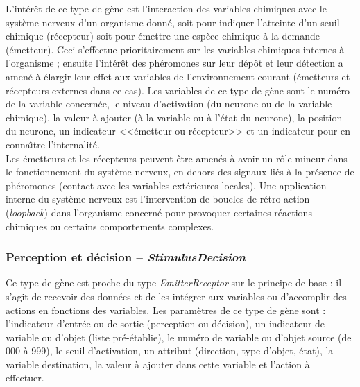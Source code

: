 \documentclass[11pt,twoside,a4paper]{article}
\begin{document}
L'int{\'e}r{\^e}t de ce type de g{\`e}ne est l'interaction des variables chimiques avec le syst{\`e}me nerveux d'un organisme donn{\'e}, soit pour indiquer l'atteinte d'un seuil chimique (r{\'e}cepteur) soit pour {\'e}mettre une esp{\`e}ce chimique {\`a} la demande ({\'e}metteur). Ceci s'effectue prioritairement sur les variables chimiques internes {\`a} l'organisme ; ensuite l'int{\'e}r{\^e}t des ph{\'e}romones sur leur d{\'e}p{\^o}t et leur d{\'e}tection a amen{\'e} {\`a} {\'e}largir leur effet aux variables de l'environnement courant ({\'e}metteurs et r{\'e}cepteurs externes dans ce cas). Les variables de ce type de g{\`e}ne sont le num{\'e}ro de la variable concern{\'e}e, le niveau d'activation (du neurone ou de la variable chimique), la valeur {\`a} ajouter ({\`a} la variable ou {\`a} l'{\'e}tat du neurone), la position du neurone, un indicateur <<{\'e}metteur ou r{\'e}cepteur>> et un indicateur pour en conna{\^\i}tre l'internalit{\'e}.~\\

Les {\'e}metteurs et les r{\'e}cepteurs peuvent {\^e}tre amen{\'e}s {\`a} avoir un r{\^o}le mineur dans le fonctionnement du syst{\`e}me nerveux, en-dehors des signaux li{\'e}s {\`a} la pr{\'e}sence de ph{\'e}romones (contact avec les variables ext{\'e}rieures locales). Une application interne du syst{\`e}me nerveux est l'intervention de boucles de r{\'e}tro-action (\emph{loopback}) dans l'organisme concern{\'e} pour provoquer certaines r{\'e}actions chimiques ou certains comportements complexes. 

\subsubsection{Perception et d{\'e}cision -- \emph{StimulusDecision}}

Ce type de g{\`e}ne est proche du type \emph{EmitterReceptor} sur le principe de base : il s'agit de recevoir des donn{\'e}es et de les int{\'e}grer aux variables ou d'accomplir des actions en fonctions des variables. Les param{\`e}tres de ce type de g{\`e}ne sont : l'indicateur d'entr{\'e}e ou de sortie (perception ou d{\'e}cision), un indicateur de variable ou d'objet (liste pr{\'e}-{\'e}tablie), le num{\'e}ro de variable ou d'objet source (de 000 {\`a} 999), le seuil d'activation, un attribut (direction, type d'objet, {\'e}tat), la variable destination, la valeur {\`a} ajouter dans cette variable et l'action {\`a} effectuer.~\\
\end{document}
